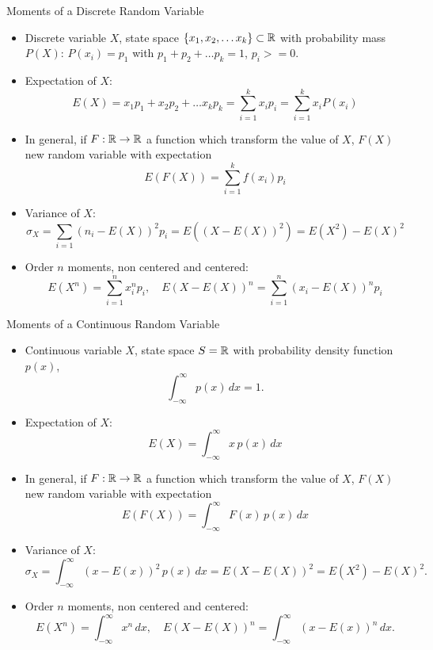 \documentclass[9pt]{beamer}
\begin{document}
\begin{frame}[t]{Moments of a Discrete Random Variable}
  \begin{itemize}
  \item Discrete variable $X$, state space $\{x_1, x_2, \dots
    x_k\}\subset {\mathbb R}$ with probability mass $P(X)$: $P(x_i) = p_1$
    with $p_1 + p_2 + \dots p_k = 1$, $p_i >= 0$.
  \item Expectation of $X$:
    $$
    E(X) = x_1p_1 + x_2p_2 + \dots x_k p_k = \sum_{i=1}^k x_i p_i = \sum_{i=1}^kx_i P(x_i)
    $$
  \item In general, if $F:{\mathbb R}\to {\mathbb R}$ a function which transform the value of $X$, $F(X)$ new random variable with expectation
    $$
    E(F(X)) = \sum_{i=1}^k f(x_i)p_i
    $$
  \item Variance of $X$:
    $$
    \sigma_X = \sum_{i=1}{\left(n_i - E(X)\right)^2p_i} = E\left(\left(X-E(X)\right)^2\right) = E(X^2) - E(X)^2
    $$
  \item Order $n$ moments, non centered and centered:
    $$
    E(X^n) = \sum_{i=1}^n x_i^n p_i,\quad E\left(X-E(X)\right)^n = \sum_{i=1}^n\left(x_i- E(X)\right)^np_i
    $$
  \end{itemize}
\end{frame}




\begin{frame}[t]{Moments of a Continuous Random Variable}
  \begin{itemize}
  \item Continuous variable $X$, state space $S={\mathbb R}$ with probability density function $p(x)$,
    $$
    \int_{-\infty}^\infty p(x)\,dx = 1.
    $$
  \item Expectation of $X$:
    $$
    E(X) = \int_{-\infty}^\infty x \,p(x)\,dx
    $$
  \item In general, if $F:{\mathbb R}\to {\mathbb R}$ a function which transform the value of $X$, $F(X)$ new random variable with expectation
    $$
    E(F(X)) = \int_{-\infty}^\infty F(x) \,p(x)\,dx
    $$
  \item Variance of $X$:
    $$
    \sigma_X = \int_{-\infty}^\infty \left(x - E(x)\right)^2 \,p(x)\,dx = E\left(X-E(X)\right)^2 = E(X^2) - E(X)^2.
    $$
  \item Order $n$ moments, non centered and centered:
    $$
    E(X^n) = \int_{-\infty}^\infty x^n\,dx,
    \quad E\left(X-E(X)\right)^n =
    \int_{-\infty}^{\infty}\left(x - E(x)\right)^n\,dx.
    $$
  \end{itemize}
\end{frame}
\end{document}
